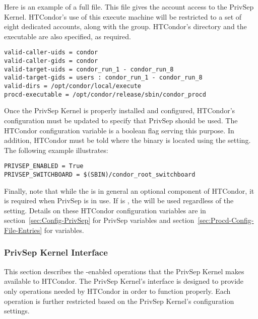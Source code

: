 Here is an example of a full  file.
This file gives the  account access to the PrivSep
Kernel. HTCondor's use of this execute machine will be restricted to a
set of eight dedicated accounts, along with the 
group. HTCondor's  directory and the 
executable are also specified, as required.
\begin{verbatim}
valid-caller-uids = condor
valid-caller-gids = condor
valid-target-uids = condor_run_1 - condor_run_8
valid-target-gids = users : condor_run_1 - condor_run_8
valid-dirs = /opt/condor/local/execute
procd-executable = /opt/condor/release/sbin/condor_procd
\end{verbatim}

Once the PrivSep Kernel is properly installed and configured, HTCondor's
configuration must be updated to specify that PrivSep should be
used. The HTCondor configuration variable  
is a boolean flag serving this purpose.
In addition, HTCondor must be told where the
 binary is located using the
 setting. The following example
illustrates:
\begin{verbatim}
PRIVSEP_ENABLED = True
PRIVSEP_SWITCHBOARD = $(SBIN)/condor_root_switchboard
\end{verbatim}

Finally, note that while the  is in general an optional
component of HTCondor, it is required when PrivSep is in use. If
 is , the  will be used
regardless of the  setting.
Details on these HTCondor configuration variables are in
section~\ref{sec:Config-PrivSep} for PrivSep variables
and 
section~\ref{sec:Procd-Config-File-Entries} for  variables.

\subsubsection{PrivSep Kernel Interface}

This section describes the -enabled operations that the
PrivSep Kernel makes available to HTCondor. The PrivSep Kernel's
interface is designed to provide only operations needed by HTCondor in
order to function properly. Each operation is further restricted based
on the PrivSep Kernel's configuration settings.

